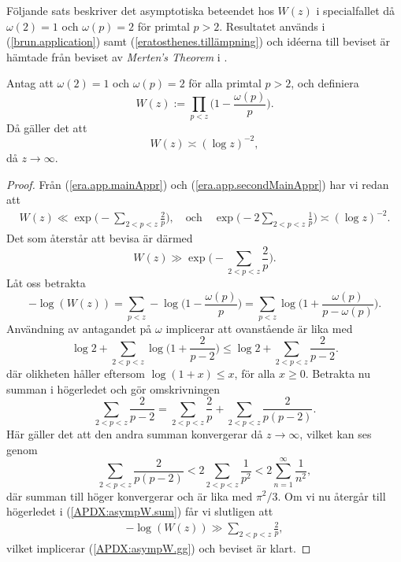Följande sats beskriver det asymptotiska beteendet hos $W(z)$ i specialfallet då $\omega(2)=1$ och $\omega(p)=2$ för primtal $p>2$. 
Resultatet används i (\ref{brun.application}) samt (\ref{eratosthenes.tillämpning}) och idéerna till beviset är hämtade från beviset av \textit{Merten's Theorem} i \cite[kap 5.2]{cojocarumurty}.

\begin{theorem} \label{APDX:asympW}
Antag att $\omega(2)=1$ och $\omega(p)=2$ för alla primtal $p>2$, och definiera 
\begin{equation*}
    W(z):=\prod_{p<z}\biggl( 1-\frac{\omega(p)}{p} \biggr).   
\end{equation*}
Då gäller det att
\begin{equation} \label{APDX:asympW.main}
    W(z) \asymp (\log z)^{-2},
\end{equation}
då $z\to\infty$.
\end{theorem}


\begin{proof}
Från (\ref{era.app.mainAppr}) och (\ref{era.app.secondMainAppr}) har vi redan att
\begin{align*}
    W(z) \ll \exp \biggl( - \sum_{2 <p < z} \frac{2}{p}  \biggr),
    \quad\text{och}\quad
    \exp \biggl( - 2 \sum_{2 <p < z} \frac{1}{p}  \biggr) \asymp (\log z)^{-2}.
\end{align*}
Det som återstår att bevisa är därmed
\begin{equation} \label{APDX:asympW.gg}
    W(z) \gg \exp \biggl( - \sum_{2 <p < z} \frac{2}{p}  \biggr).
\end{equation}
Låt oss betrakta
\begin{equation*}
    -\log(W(z)) 
    = \sum_{p < z} -\log\biggl( 1-\frac{\omega(p)}{p} \biggr) 
    = \sum_{p < z} \log\biggl( 1+\frac{\omega(p)}{p-\omega(p)} \biggr).
\end{equation*}
Användning av antagandet på $\omega$ implicerar att ovanstående är lika med 
\begin{equation} \label{APDX:asympW.sum}
    \log 2 + \sum_{2<p<z} \log\biggl( 1+\frac{2}{p-2} \biggr)
    \leq \log 2 + \sum_{2<p<z} \frac{2}{p-2}.
\end{equation}
där olikheten håller eftersom $\log(1+x)\leq x$, för alla $x\geq0$. 
Betrakta nu summan i högerledet och gör omskrivningen
\begin{equation*}
    \sum_{2 <p < z} \frac{2}{p-2} = \sum_{2 <p < z} \frac{2}{p} + \sum_{2 <p < z} \frac{2}{p(p-2)}.
\end{equation*}
Här gäller det att den andra summan konvergerar då $z\to\infty$, vilket kan ses genom
\begin{equation*}
    \sum_{2 <p < z} \frac{2}{p(p-2)} < 2\sum_{2 <p < z} \frac{1}{p^2} < 2\sum_{n = 1}^\infty \frac{1}{n^2},
\end{equation*}
där summan till höger konvergerar och är lika med $\pi^2/3$.
Om vi nu återgår till högerledet i (\ref{APDX:asympW.sum}) får vi slutligen att
\begin{align*}
    -\log(W(z)) \gg \sum_{2 <p < z} \frac{2}{p},
\end{align*}
vilket implicerar (\ref{APDX:asympW.gg}) och beviset är klart.
\end{proof}